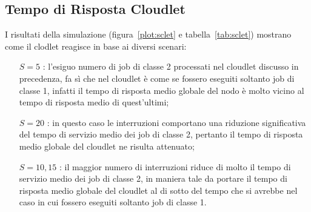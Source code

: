 \subsection{Tempo di Risposta Cloudlet}
I risultati della simulazione (figura~\ref{plot:sclet} e
tabella~\ref{tab:sclet}) mostrano come il clodlet reagisce in base ai diversi
scenari:
\begin{itemize}
\item[$S=5$ :] l'esiguo numero di job di classe 2 processati nel cloudlet
discusso in precedenza, fa sì che nel cloudlet è come se fossero eseguiti
soltanto job di classe 1, infatti il tempo di risposta medio globale del nodo è
molto vicino al tempo di risposta medio di quest'ultimi;
\item[$S=20$ :] in questo caso le interruzioni comportano una riduzione
significativa del tempo di servizio medio dei job di classe 2, pertanto il tempo
di risposta medio globale del cloudlet ne risulta attenuato;
\item[$S=10,15$ :] il maggior numero di interruzioni riduce di molto il tempo di
servizio medio dei job di classe 2, in maniera tale da portare il tempo di
risposta medio globale del cloudlet al di sotto del tempo che si avrebbe nel
caso in cui fossero eseguiti soltanto job di classe 1.
\end{itemize}

